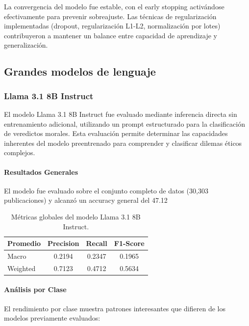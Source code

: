 La convergencia del modelo fue estable, con el early stopping activándose efectivamente para prevenir sobreajuste. Las técnicas de regularización implementadas (dropout, regularización L1-L2, normalización por lotes) contribuyeron a mantener un balance entre capacidad de aprendizaje y generalización.

\subsection{Grandes modelos de lenguaje}

\subsubsection{Llama 3.1 8B Instruct}

El modelo Llama 3.1 8B Instruct fue evaluado mediante inferencia directa sin entrenamiento adicional, utilizando un prompt estructurado para la clasificación de veredictos morales. Esta evaluación permite determinar las capacidades inherentes del modelo preentrenado para comprender y clasificar dilemas éticos complejos.

\paragraph{Resultados Generales}

El modelo fue evaluado sobre el conjunto completo de datos (30,303 publicaciones) y alcanzó un accuracy general del 47.12%

\begin{table}[H]
\centering
\caption{Métricas globales del modelo Llama 3.1 8B Instruct.}
\begin{tabular}{lccc}
\toprule
\textbf{Promedio} & \textbf{Precision} & \textbf{Recall} & \textbf{F1-Score} \\
\midrule
Macro & 0.2194 & 0.2347 & 0.1965 \\
Weighted & 0.7123 & 0.4712 & 0.5634 \\
\bottomrule
\end{tabular}
\end{table}

\paragraph{Análisis por Clase}

El rendimiento por clase muestra patrones interesantes que difieren de los modelos previamente evaluados:

